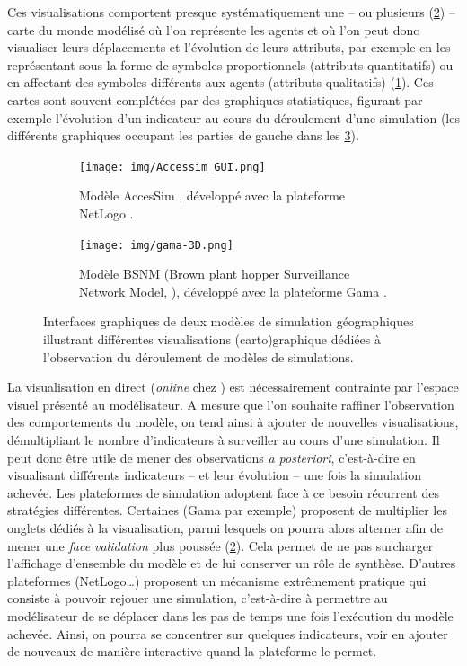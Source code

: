 \documentclass[a4paper, 12pt]{article}
\begin{document}
Ces visualisations comportent presque systématiquement une -- ou plusieurs (\cref{fig:gui-gama}) -- carte du \og monde\fg{} modélisé où l'on représente les agents et où l'on peut donc visualiser leurs déplacements et l'évolution de leurs attributs, par exemple en les représentant sous la forme de symboles proportionnels (attributs quantitatifs) ou en affectant des symboles différents aux agents (attributs qualitatifs) (\cref{fig:gui-netlogo}).
Ces cartes sont souvent complétées par des graphiques statistiques, figurant par exemple l'évolution d'un indicateur au cours du déroulement d'une simulation (les différents graphiques occupant les parties de gauche dans les \cref{fig:gui}).

\begin{figure}[H]
\centering
\begin{subfigure}{.5\linewidth}
	\centering
	\texttt{[image: img/Accessim\_GUI.png]}
	\captionsetup{width = .9\linewidth}
	\caption{Modèle AccesSim \autocite{delage:halshs-00607754}, développé avec la plateforme NetLogo \autocite{tisue_netlogo_2004}.}
	\label{fig:gui-netlogo}
\end{subfigure}%
\begin{subfigure}{.5\linewidth}
	\texttt{[image: img/gama-3D.png]}
	\captionsetup{width = 1\linewidth}
	\caption{Modèle BSNM (Brown plant hopper Surveillance Network Model, \textcite{truong_modeling_2012}), développé avec la plateforme Gama \autocite{taillandier_building_2018}.}
	\label{fig:gui-gama}
\end{subfigure}
\caption{Interfaces graphiques de deux modèles de simulation géographiques illustrant différentes visualisations (carto)graphique dédiées à l'observation du déroulement de modèles de simulations.}
\label{fig:gui}
\end{figure}

La visualisation \og en direct\fg{} (\textit{online} chez \textcite{grignard_agent-based_2017}) est nécessairement contrainte par l'espace visuel présenté au modélisateur.
A mesure que l'on souhaite raffiner l'observation des comportements du modèle, on tend ainsi à ajouter de nouvelles visualisations, démultipliant le nombre d'indicateurs à surveiller au cours d'une simulation.
Il peut donc être utile de mener des observations \textit{a posteriori}, c'est-à-dire en visualisant différents indicateurs -- et leur évolution -- une fois la simulation achevée.
Les plateformes de simulation adoptent face à ce besoin récurrent des stratégies différentes.
Certaines (Gama par exemple) proposent de multiplier les onglets dédiés à la visualisation, parmi lesquels on pourra alors alterner afin de mener une \textit{face validation} plus poussée (\cref{fig:gui-gama}).
Cela permet de ne pas surcharger l'affichage d'ensemble du modèle et de lui conserver un rôle de synthèse.
D'autres plateformes (NetLogo\ldots) proposent un mécanisme extrêmement pratique qui consiste à pouvoir \og rejouer\fg{} une simulation, c'est-à-dire à permettre au modélisateur de se déplacer dans les pas de temps une fois l'exécution du modèle achevée.
Ainsi, on pourra se concentrer sur quelques indicateurs, voir en ajouter de nouveaux de manière interactive quand la plateforme le permet.
\end{document}
